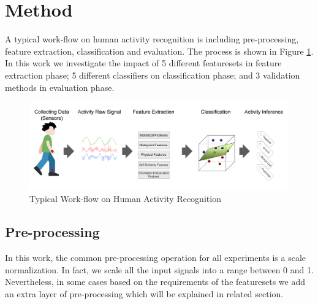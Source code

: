 \documentclass[journal,article,submit,moreauthors,pdftex]{Definitions/mdpi}
\begin{document}
\section{Method}
A typical work-flow on human activity recognition is including pre-processing, feature extraction, classification and evaluation. The process is shown in Figure \ref{fig:main_approach}. In this work we investigate the impact of 5 different featuresets in feature extraction phase; 5 different classifiers on classification phase; and 3 validation methods in evaluation phase.                                                                                                                                                                                       
                                                                                                                                                                                        
\begin{figure}[H]
	\centering
	\includegraphics[width=14 cm]{Definitions/images/main_approach.jpg}
	\caption{Typical Work-flow on Human Activity Recognition}
	\label{fig:main_approach}
\end{figure} 


\subsection{Pre-processing}
In this work, the common pre-processing operation for all experiments is a scale normalization. In fact, we scale all the input signals into a range between 0 and 1. Nevertheless, in some cases based on the requirements of the featuresets we add an extra layer of pre-processing which will be explained in related section.
\end{document}
